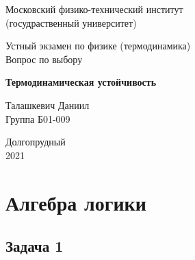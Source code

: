 \documentclass[a4paper,14pt]{article} %
\begin{document}


\begin{titlepage}

	\newpage
	\begin{center}
		\normalsize Московский физико-технический институт \\(госудраственный 			университет)
	\end{center}

	\vspace{6em}

	\begin{center}
		\Large Устный экзамен по физике (термодинамика)\\Вопрос по выбору
	\end{center}

	\vspace{1em}

	\begin{center}
		\large \textbf{Термодинамическая устойчивость}
	\end{center}

	\vspace{2em}

	\begin{center}
		\large Талашкевич Даниил\\
		Группа Б01-009
	\end{center}

	\vspace{\fill}

	\begin{center}
	Долгопрудный \\2021
	\end{center}
	
\end{titlepage}



\thispagestyle{empty}
\newpage
\tableofcontents
\newpage
\setcounter{page}{1}



\section{Алгебра логики}

\subsection{Задача 1}
\end{document}
